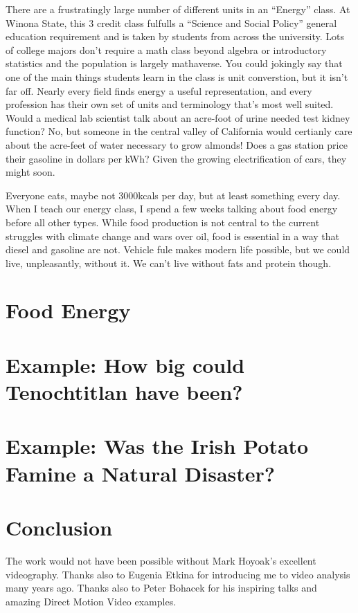 \documentclass[12pt]{iopart}
\begin{document}
There are a frustratingly large number of different units in an ``Energy'' class.  At Winona State, this 3 credit class fulfulls a ``Science and Social Policy'' general education requirement and is taken by students from across the university.   Lots of college majors don't require a math class beyond algebra or introductory statistics and the population is largely mathaverse. You could jokingly say that one of the main things students learn in the class is unit converstion, but it isn't far off.  Nearly every field finds energy a useful representation, and every profession has their own set of units and terminology that's most well suited.  Would a medical lab scientist talk about an acre-foot of urine needed test kidney function?  No, but someone in the central valley of California would certianly care about the acre-feet of water necessary to grow almonds!  Does a gas station price their gasoline in dollars per kWh? Given the growing electrification of cars, they might soon.

Everyone eats, maybe not 3000kcals per day, but at least something every day.  When I teach our energy class, I spend a few weeks talking about food energy before all other types.  While food production is not central to the current struggles with climate change and wars over oil, food is essential in a way that diesel and gasoline are not.  Vehicle fule makes modern life possible, but we could live, unpleasantly, without it.  We can't live without fats and protein though.  

\section{Food Energy}

\section{Example: How big could Tenochtitlan have been?}

\section{Example: Was the Irish Potato Famine a Natural Disaster?}

\section{Conclusion}


\ack
The work would not have been possible without Mark Hoyoak's excellent videography.  Thanks also to Eugenia Etkina for introducing me to video analysis many years ago.  Thanks also to Peter Bohacek for his inspiring talks and amazing Direct Motion Video examples.  
\end{document}
